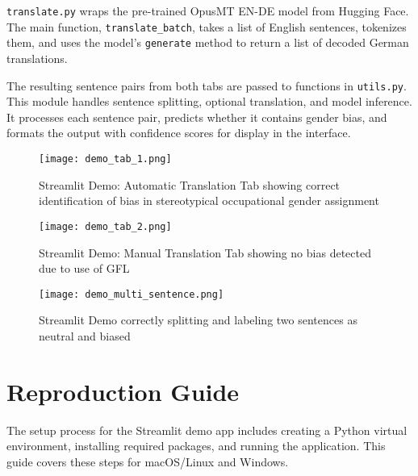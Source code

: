         \texttt{translate.py} wraps the pre-trained OpusMT EN-DE model from Hugging Face. The main function, \texttt{translate\_batch}, takes a list of English sentences, tokenizes them, and uses the model’s \texttt{generate} method to return a list of decoded German translations.

        The resulting sentence pairs from both tabs are passed to functions in \texttt{utils.py}. This module handles sentence splitting, optional translation, and model inference. It processes each sentence pair, predicts whether it contains gender bias, and formats the output with confidence scores for display in the interface.

        \vspace{0.8em}
        \begin{figure}[H]
            \centering
            \texttt{[image: demo\_tab\_1.png]}
            \caption[Streamlit Demo: Automatic Translation Tab]{Streamlit Demo: Automatic Translation Tab showing correct identification of bias in stereotypical occupational gender assignment}
            \label{fig:demo_tab_1}
        \end{figure}
        \vspace{0.8em}

        \begin{figure}[H]
            \centering
            \texttt{[image: demo\_tab\_2.png]}
            \caption[Streamlit Demo: Manual Translation Tab]{Streamlit Demo: Manual Translation Tab showing no bias detected due to use of GFL}
            \label{fig:demo_tab_2}
        \end{figure}
        \vspace{0.8em}

        \begin{figure}[H]
            \centering
            \texttt{[image: demo\_multi\_sentence.png]}
            \caption[Streamlit Demo: Multi Sentence Translation]{Streamlit Demo correctly splitting and labeling two sentences as neutral and biased}
            \label{fig:demo_multi_sentence}
        \end{figure}
        \vspace{0.8em}

\section{Reproduction Guide} \label{section:reproduction_guide}
   The setup process for the Streamlit demo app includes creating a Python virtual environment, installing required packages, and running the application. This guide covers these steps for macOS/Linux and Windows. 
   
